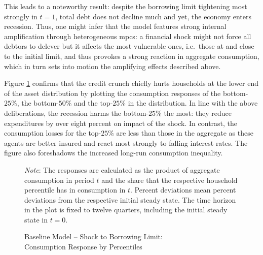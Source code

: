 \documentclass[a4paper,12pt]{article} %
\numberwithin{equation}{section} %
\numberwithin{figure}{section}
\numberwithin{table}{section}
\begin{document}
This leads to a noteworthy result: despite the borrowing limit tightening most strongly in $t=1$, total debt does not decline much and yet, the economy enters recession. Thus, one might infer that the model features strong internal amplification through heterogeneous \Gls{mpc}s: a financial shock might not force all debtors to delever but it affects the most vulnerable ones, i.e.~those at and close to the initial limit, and thus provokes a strong reaction in aggregate consumption, which in turn sets into motion the amplifying effects described above.

Figure \ref{fig:baseline-permanent-limit-dist-c-response} confirms that the credit crunch chiefly hurts households at the lower end of the asset distribution by plotting the consumption responses of the bottom-$25\%$, the bottom-$50\%$ and the top-$25\%$ in the distribution. In line with the above deliberations, the recession harms the bottom-$25\%$ the most: they reduce expenditures by over eight percent on impact of the shock. In contrast, the consumption losses for the top-$25\%$ are less than those in the aggregate as these agents are better insured and react most strongly to falling interest rates. The figure also foreshadows the increased long-run consumption inequality.

\begin{figure}[t]
    \centering
    \caption{Baseline Model -- Shock to Borrowing Limit: \\ Consumption Response by Percentiles}
    \label{fig:baseline-permanent-limit-dist-c-response}
    

    \vspace{10pt}
    
    \begin{minipage}{0.75\textwidth} 
    \footnotesize
    \textit{Note}: The responses are calculated as the product of aggregate consumption in period $t$ and the share that the respective household percentile has in consumption in $t$. Percent deviations mean percent deviations from the respective initial steady state. The time horizon in the plot is fixed to twelve quarters, including the initial steady state in $t=0$.
    \end{minipage}
\end{figure}
\end{document}
